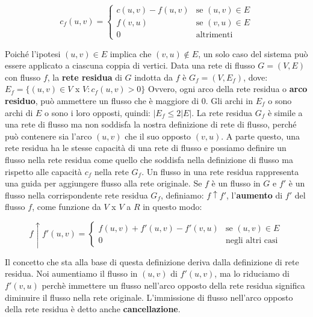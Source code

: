 \documentclass{article}
\begin{document}
\begin{center}
\[c_f(u, v) =\left\{
  \begin{array}{lr}
    c(u,v) - f(u, v) & \mbox{se } (u, v) \in E\\
    f(v, u) & \mbox{se } (v, u) \in E\\
    0 & \mbox{altrimenti}
  \end{array}
\right.
\]
\newline
\end{center}
\begin{flushleft}
Poiché l'ipotesi $(u,v) \in E$ implica che $(v,u) \notin E$, un solo caso del sistema può essere applicato a ciascuna coppia di vertici.
\newline
Data una rete di flusso $G = (V, E)$ con flusso $f$, la \textbf{rete residua} di $G$ indotta da $f$ è $G_f = (V, E_f)$, dove:
\newline
\newline
$E_f = \{(u,v) \in V$ x $V: c_f(u,v) > 0\}$
\newline
\newline
Ovvero, ogni arco della rete residua o \textbf{arco residuo}, può ammettere un flusso che è maggiore di 0.
\newline
Gli archi in $E_f$ o sono archi di $E$ o sono i loro opposti, quindi: $|E_f \leq 2|E|$.
\newline
\newline
La rete residua $G_f$ è simile a una rete di flusso ma non soddisfa la nostra definizione di rete di flusso, perché può contenere sia l'arco $(u,v)$ che il suo opposto $(v,u)$. A parte questo, una rete residua ha le stesse capacità di una rete di flusso e possiamo definire un flusso nella rete residua come quello che soddisfa nella definizione di flusso ma rispetto alle capacità $c_f$ nella rete $G_f$.
\newline
Un flusso in una rete residua rappresenta una guida per aggiungere flusso alla rete originale. Se $f$ è un flusso in $G$ e $f'$ è un flusso nella corrispondente rete residua $G_f$, definiamo:
\newline
$f \uparrow f'$, l'\textbf{aumento} di $f'$ del flusso $f$, come funzione da $V$ x $V$ a $R$ in questo modo:
\newline
\newline
\begin{center}
\[f\uparrow f'(u, v) =\left\{
  \begin{array}{lr}
    f(u, v) + f'(u, v) - f'(v,u) & \mbox{se } (u, v) \in E\\
    0 & \mbox{negli altri casi } 
  \end{array}
\right.
\]
\newline
\end{center}
Il concetto che sta alla base di questa definizione deriva dalla definizione di rete residua. Noi aumentiamo il flusso in $(u, v)$ di $f'(u, v)$, ma lo riduciamo di $f'(v, u)$ perchè immettere un flusso nell'arco opposto della rete residua significa diminuire il flusso nella rete originale. L'immissione di flusso nell'arco opposto della rete residua è detto anche \textbf{cancellazione}.
\end{flushleft}
\end{document}
